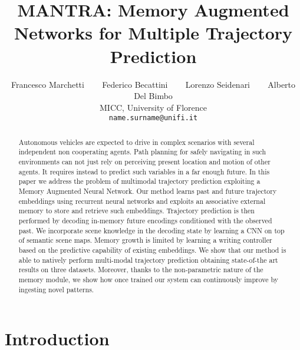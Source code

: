 \documentclass[10pt,twocolumn,letterpaper]{article}
\begin{document}
\title{MANTRA: Memory Augmented Networks for Multiple Trajectory Prediction}

\author{Francesco Marchetti ~~~ Federico Becattini ~~~ Lorenzo Seidenari ~~~ Alberto Del Bimbo\\
MICC, University of Florence\\
{\tt\small name.surname@unifi.it}
}

\maketitle
\thispagestyle{empty}

\begin{abstract}
   Autonomous vehicles are expected to drive in complex scenarios with several independent non cooperating agents. Path planning for safely navigating in such environments can not just rely on perceiving present location and motion of other agents. It requires instead to predict such variables in a far enough future. In this paper we address the problem of multimodal trajectory prediction exploiting a Memory Augmented Neural Network. Our method learns past and future trajectory embeddings using recurrent neural networks and exploits an associative external memory to store and retrieve such embeddings. Trajectory prediction is then performed by decoding in-memory future encodings conditioned with the observed past. We incorporate scene knowledge in the decoding state by learning a CNN on top of semantic scene maps.  Memory growth is limited by learning a writing controller based on the predictive capability of existing embeddings. We show that our method is able to natively perform multi-modal trajectory prediction obtaining state-of-the art results on three datasets. Moreover, thanks to the non-parametric nature of the memory module, we show how once trained our system can continuously improve by ingesting novel patterns.
\end{abstract}

\vspace{-10pt}
\section{Introduction}
\end{document}
